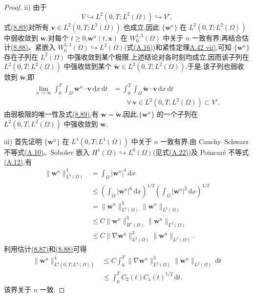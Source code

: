 \begin{lemma}[收敛子列的存在性]
\begin{proof}
ii) 由于
\[
 V\hookrightarrow L^2(0,T;L^2(\Omega))\hookrightarrow V',
\]
式\hyperref[eq:smagorinsky-weak-limit]{(8.89)}对所有 $\bm{v}\in L^2(0,T;L^2(\Omega))$ 也成立,因此 $\{\bm{w}^n\}$ 在 $L^2(0,T;L^2(\Omega))$ 中弱收敛到 $\bm{w}$.对每个 $t\ge0$,$\bm{w}^n(t,\bm{x})$ 在 $W_0^{1,3}(\Omega)$ 中关于 $n$ 一致有界;再结合估计\hyperref[eq:smagorinsky-galerkin-h1-estimate]{(8.88)}、紧嵌入 $W_0^{1,3}(\Omega)\hookrightarrow L^2(\Omega)$(式\hyperref[eq:appendix-a-16]{(A.16)})和紧性定理\hyperref[thm:appendix-a-42]{A.42 vii)},可知 $\{\bm{w}^n\}$ 存在子列在 $L^2(\Omega)$ 中强收敛到某个极限.上述结论对各时刻均成立,因而该子列在 $L^2(0,T;L^2(\Omega))$ 中强收敛到某个 $\widetilde{\bm{w}}\in L^2(0,T;L^2(\Omega))$.于是,该子列也弱收敛到 $\widetilde{\bm{w}}$,即
\[
\begin{aligned}
 \lim_{n\to\infty}\int_0^T\int_\Omega
       \bm{w}^n\cdot\bm{v}\,\mathrm{d}x\,\mathrm{d}t
 &=\int_0^T\int_\Omega
       \widetilde{\bm{w}}\cdot\bm{v}\,\mathrm{d}x\,\mathrm{d}t\\
 &\qquad
 \forall\,\bm{v}\in L^2(0,T;L^2(\Omega))\subset V'.
\end{aligned}
\]
由弱极限的唯一性及式\hyperref[eq:smagorinsky-weak-limit]{(8.89)},有 $\bm{w}=\widetilde{\bm{w}}$.因此,$\{\bm{w}^n\}$ 的一个子列在 $L^2(0,T;L^2(\Omega))$ 中强收敛到 $\bm{w}$.

iii) 首先证明 $\{\bm{w}^n\}$ 在 $L^4(0,T;L^4(\Omega))$ 中关于 $n$ 一致有界.由 Cauchy--Schwarz 不等式\hyperref[eq:appendix-a-10]{(A.10)}、Sobolev 嵌入 $H^1(\Omega)\hookrightarrow L^6(\Omega)$(见式\hyperref[eq:appendix-a-22]{(A.22)})及 Poincaré 不等式\hyperref[eq:appendix-a-12]{(A.12)},有
\[
\begin{aligned}
 \|\bm{w}^n\|_{L^4(\Omega)}^4
 &=\int_\Omega|\bm{w}^n|^4\,\mathrm{d}x\\
 &\le
   \left(\int_\Omega|\bm{w}^n|^6\,\mathrm{d}x\right)^{1/2}
   \left(\int_\Omega|\bm{w}^n|^2\,\mathrm{d}x\right)^{1/2}\\
 &=\|\bm{w}^n\|_{L^6(\Omega)}^3
       \|\bm{w}^n\|_{L^2(\Omega)}\\
 &\le C\|\bm{w}^n\|_{H^1(\Omega)}^3
       \|\bm{w}^n\|_{L^2(\Omega)}\\
 &\le C\|\nabla\bm{w}^n\|_{L^2(\Omega)}^3
       \|\bm{w}^n\|_{L^2(\Omega)}.
\end{aligned}
\]
利用估计\hyperref[eq:smagorinsky-galerkin-energy-estimate]{(8.87)}和\hyperref[eq:smagorinsky-galerkin-h1-estimate]{(8.88)}可得
\[
\begin{aligned}
 \|\bm{w}^n\|_{L^4(0,T;L^4(\Omega))}^4
 &\le C\int_0^T
       \|\nabla\bm{w}^n\|_{L^2(\Omega)}^3
       \|\bm{w}^n\|_{L^2(\Omega)}\,\mathrm{d}t\\
 &\le \int_0^T C_2(t)C_1(t)^{1/2}\,\mathrm{d}t.
\end{aligned}
\]
该界关于 $n$ 一致.


\end{proof}
\end{lemma}
